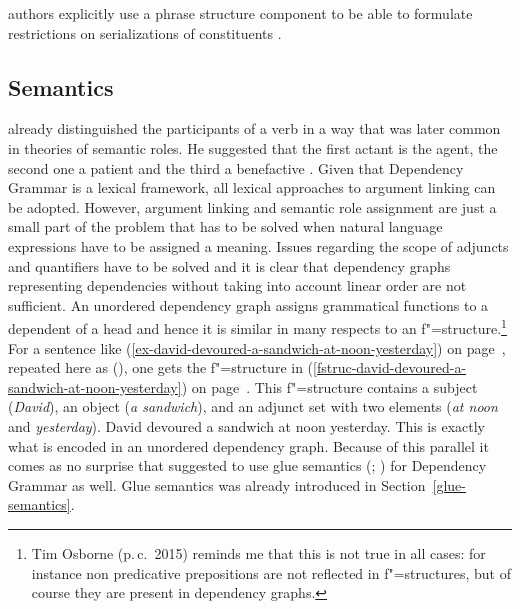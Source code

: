 authors explicitly use a phrase structure component to be able to formulate restrictions on
serializations of constituents \citep{GK2001a,Hellwig2003a}. 



\subsection{Semantics}

\addlines
\tes already distinguished the participants of a verb in a way that was later common in theories of
semantic roles. He suggested that the first actant is the agent, the second one a patient and the
third a benefactive \citep[Chapter~106]{Tesniere2015a-u}.
Given that Dependency Grammar is a lexical framework, all
lexical approaches to argument linking can be adopted. However, argument linking and semantic
role assignment are just a small part of the problem that has to be solved when natural language
expressions have to be assigned a meaning. 
Issues regarding the scope of adjuncts and quantifiers
have to be solved and it is clear that dependency graphs representing dependencies without taking
into account linear order are not sufficient. An unordered dependency graph assigns grammatical
functions to a dependent of a head and hence it is similar in many respects to an \lfg
f"=structure.\footnote{
Tim Osborne (p.\,c.\ 2015) reminds me that this is not true in all cases: for instance non
predicative prepositions are not reflected in f"=structures, but of course they are present in
dependency graphs.
} For a sentence
like (\ref{ex-david-devoured-a-sandwich-at-noon-yesterday}) on page~\pageref{ex-david-devoured-a-sandwich-at-noon-yesterday}, repeated here as (), one gets
the f"=structure in (\ref{fstruc-david-devoured-a-sandwich-at-noon-yesterday}) on
page~\pageref{fstruc-david-devoured-a-sandwich-at-noon-yesterday}. This f"=structure contains a
subject (\emph{David}), an object (\emph{a sandwich}), and an adjunct set with two elements
(\emph{at noon} and \emph{yesterday}).
\ea
\label{ex-david-devoured-a-sandwich-at-noon-yesterday-two}
David devoured a sandwich at noon yesterday.
\z
This is exactly what is encoded in an unordered dependency graph. Because of this parallel it comes
as no surprise that \citet[]{Broeker2003a-u} suggested to use glue semantics
(\citealp*{DLS93a-u}; \citealp[Chapter~8]{Dalrymple2001a-u}) for Dependency
Grammar as well. Glue semantics was already introduced in Section~\ref{glue-semantics}.

